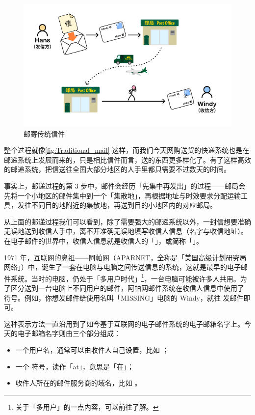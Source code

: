 \begin{figure}[htb!]
  \centering
  \includegraphics[width=.7\textwidth]{assets/software/Traditional_mail.pdf}
  \caption{邮寄传统信件}
  \label{fig:Traditional_mail}
\end{figure}

整个过程就像\autoref{fig:Traditional_mail} 这样，而我们今天网购送货的快递系统也是在邮递系统上发展而来的，只是相比信件而言，送的东西更多样化了。有了这样高效的邮递系统，把信送往全国大部分地区的人手里都只需要不过数天的时间。

\begin{note}
  事实上，邮递过程的第 3 步中，邮件会经历「先集中再发出」的过程——邮局会先将一个小地区的邮件集中到一个「集散地」，再根据地址与时效要求分配运输工具，发往不同目的地附近的集散地，再送到目的小地区内的对应邮局。
\end{note}

从上面的邮递过程我们可以看到，除了需要强大的邮递系统以外，一封信想要准确无误地送到收信人手中，离不开准确无误地填写收信人信息（名字与收信地址）。在电子邮件的世界中，收信人信息就是收信人的「」，或简称「」。

1971 年，互联网的鼻祖——阿帕网（APARNET，全称是「美国高级计划研究局网络」）中，诞生了一套在电脑与电脑之间传送信息的系统，这就是最早的电子邮件系统。当时的电脑，仍处于「多用户时代」\footnote{关于「多用户」的一点内容，可以前往了解。}，一台电脑可能被许多人共用。为了区分送到一台电脑上不同用户的邮件，阿帕网邮件系统在收信人信息中使用了  符号。例如，你想发邮件给使用名叫「MISSING」电脑的 Windy，就往  发邮件即可。

这种表示方法一直沿用到了如今基于互联网的电子邮件系统的电子邮箱名字上。今天的电子邮箱名字则由三个部分组成：

\begin{itemize}
  \item 一个用户名，通常可以由收件人自己设置，比如 ；
  \item 一个  符号，读作「at」，意思是「在」；
  \item 收件人所在的邮件服务商的域名，比如 。
\end{itemize}

